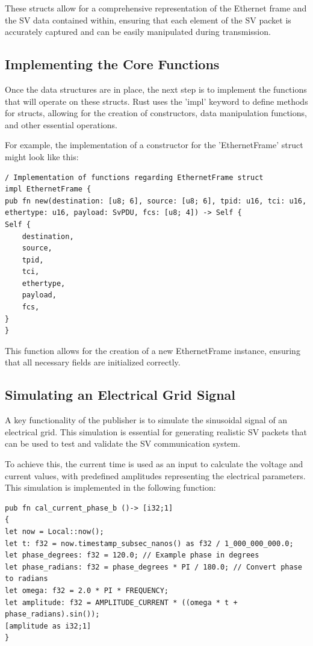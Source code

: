 These structs allow for a comprehensive representation of the Ethernet frame and the SV data contained within, ensuring that each element of the SV packet is accurately captured and can be easily manipulated during transmission.

\subsection{Implementing the Core Functions}

Once the data structures are in place, the next step is to implement the functions that will operate on these structs. Rust uses the 'impl' keyword to define methods for structs, allowing for the creation of constructors, data manipulation functions, and other essential operations.

For example, the implementation of a constructor for the 'EthernetFrame' struct might look like this:

\begin{lstlisting}[caption={How to implement an impl for the struct}]
/ Implementation of functions regarding EthernetFrame struct
impl EthernetFrame {
pub fn new(destination: [u8; 6], source: [u8; 6], tpid: u16, tci: u16, ethertype: u16, payload: SvPDU, fcs: [u8; 4]) -> Self {
Self {
	destination,
	source,
	tpid,
	tci,
	ethertype,
	payload,
	fcs,
}
}
\end{lstlisting}

This function allows for the creation of a new EthernetFrame instance, ensuring that all necessary fields are initialized correctly.

\subsection{Simulating an Electrical Grid Signal}

A key functionality of the publisher is to simulate the sinusoidal signal of an electrical grid. This simulation is essential for generating realistic SV packets that can be used to test and validate the SV communication system.

To achieve this, the current time is used as an input to calculate the voltage and current values, with predefined amplitudes representing the electrical parameters. This simulation is implemented in the following function:

\begin{lstlisting}[caption={How to calculate the value of the SV's }]
pub fn cal_current_phase_b ()-> [i32;1]
{
let now = Local::now();
let t: f32 = now.timestamp_subsec_nanos() as f32 / 1_000_000_000.0;
let phase_degrees: f32 = 120.0; // Example phase in degrees
let phase_radians: f32 = phase_degrees * PI / 180.0; // Convert phase to radians
let omega: f32 = 2.0 * PI * FREQUENCY;
let amplitude: f32 = AMPLITUDE_CURRENT * ((omega * t + phase_radians).sin());
[amplitude as i32;1]
}
\end{lstlisting}

